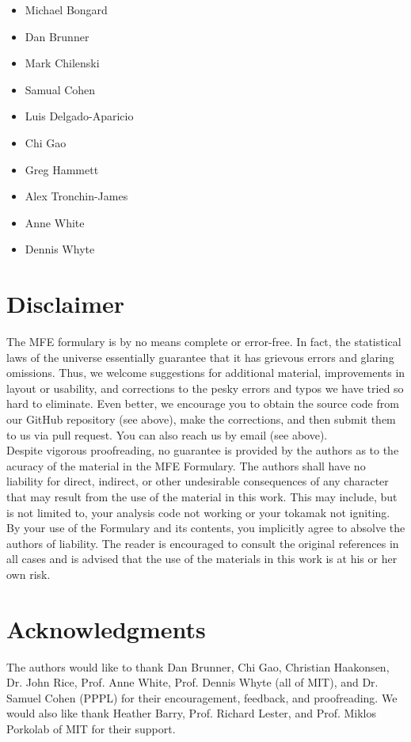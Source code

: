 \begin{multicols}{2}
\begin{itemize}
\item Michael Bongard
\item Dan Brunner
\item Mark Chilenski
\item Samual Cohen
\item Luis Delgado-Aparicio
\item Chi Gao
\item Greg Hammett 
\item Alex Tronchin-James
\item Anne White
\item Dennis Whyte 
\end{itemize}
\end{multicols}


\section*{Disclaimer}
The MFE formulary is by no means complete or error-free. In fact, the
statistical laws of the universe essentially guarantee that it has
grievous errors and glaring omissions. Thus, we welcome suggestions
for additional material, improvements in layout or usability, and
corrections to the pesky errors and typos we have tried so hard to
eliminate. Even better, we encourage you to obtain the source code
from our GitHub repository (see above), make the corrections, and then
submit them to us via pull request. You can also reach us by email
(see above).\\

\noindent
Despite vigorous proofreading, no guarantee is provided by the authors
as to the acuracy of the material in the MFE Formulary. The authors
shall have no liability for direct, indirect, or other undesirable
consequences of any character that may result from the use of the
material in this work. This may include, but is not limited to, your
analysis code not working or your tokamak not igniting. By your use of
the Formulary and its contents, you implicitly agree to absolve the
authors of liability. The reader is encouraged to consult the original
references in all cases and is advised that the use of the materials
in this work is at his or her own risk.

\section*{Acknowledgments}
The authors would like to thank Dan Brunner, Chi Gao, Christian
Haakonsen, Dr. John Rice, Prof. Anne White, Prof. Dennis Whyte
(all of MIT), and Dr. Samuel Cohen (PPPL) for their encouragement,
feedback, and proofreading. We would also like thank Heather Barry,
Prof. Richard Lester, and Prof. Miklos Porkolab of MIT for their
support.\\

